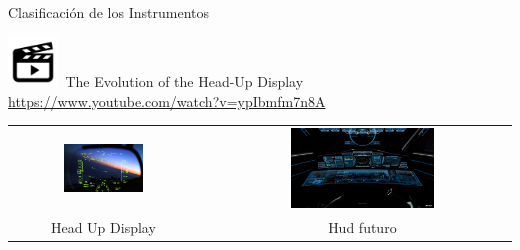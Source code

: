 \documentclass[10pt]{beamer}
\begin{document}
\begin{frame}{Clasificaci\'on de los Instrumentos}

{\includegraphics[width=0.1\textwidth]{imagenes/Video.png}}\,
The Evolution of the Head-Up Display \url{https://www.youtube.com/watch?v=ypIbmfm7n8A}
\vspace{3mm}

  \begin{tabular}{ccc}
    \includegraphics[width=0.45\textwidth]{imagenes/1.2.clasificacion.instrumentos/hud.jpg} & \hspace{3mm}
&     \includegraphics[width=0.5\textwidth]{imagenes/1.2.clasificacion.instrumentos/viper_11.png}
\\
\parbox{0.45\textwidth}{Head Up Display}
&
& Hud futuro
\\
  \end{tabular}

\end{frame}
\end{document}
